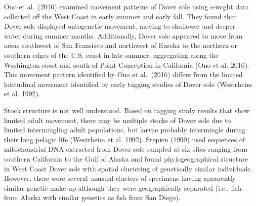 \documentclass[11pt,
  english,
  a4paper,
]{article}
\begin{document}

Ono et al.~{(2016)\leavevmode\tagmcend\tagstructend} examined movement patterns of Dover sole using \gls{s-wcgbt} data collected off the West Coast in early summer and early fall. They found that Dover sole displayed ontogenetic movement, moving to shallower and deeper water during summer months. Additionally, Dover sole appeared to move from areas southwest of San Fransisco and northwest of Eureka to the northern or southern edges of the U.S. coast in late summer, aggregating along the Washington coast and south of Point Conception in California {(Ono et al. 2016)\leavevmode\tagmcend\tagstructend}. This movement pattern identified by Ono et al.~{(2016)\leavevmode\tagmcend\tagstructend} differs from the limited latitudinal movement identified by early tagging studies of Dover sole {(Westrheim et al. 1992)\leavevmode\tagmcend\tagstructend}.

\leavevmode\tagmcend\tagstructend\par


Stock structure is not well understood. Based on tagging study results that show limited adult movement, there may be multiple stocks of Dover sole due to limited intermingling adult populations, but larvae probably intermingle during their long pelagic life {(Westrheim et al. 1992)\leavevmode\tagmcend\tagstructend}. Stepien {(1999)\leavevmode\tagmcend\tagstructend} used sequences of mitochondrial DNA extracted from Dover sole sampled at six sites ranging from southern California to the Gulf of Alaska and found phylogeographical structure in West Coast Dover sole with spatial clustering of genetically similar individuals. However, there were several unusual clusters of specimens having apparently similar genetic make-up although they were geographically separated (i.e., fish from Alaska with similar genetics as fish from San Diego).

\leavevmode\tagmcend\tagstructend\par

\end{document}
